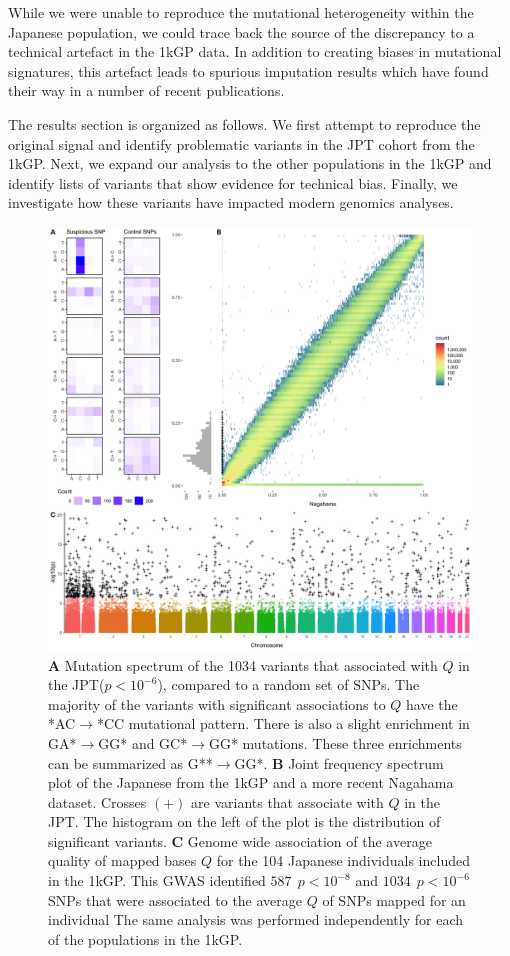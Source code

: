 \documentclass[9pt,lineno]{elife}
\begin{document}
While we were unable to reproduce the mutational heterogeneity within the Japanese population, we could trace back the source of the discrepancy to a technical artefact in the 1kGP data.
In addition to creating biases in mutational signatures, this artefact leads to spurious imputation results which have found their way in a number of recent publications.


The results section is organized as follows.
We first attempt to reproduce the original signal and identify problematic variants in the JPT cohort from the 1kGP. 
Next, we expand our analysis to the other populations in the 1kGP and identify lists of variants that show evidence for technical bias.
Finally, we investigate how these variants have impacted modern genomics analyses.  
  

\begin{figure}
\includegraphics[width=\hsize,keepaspectratio]{./Figures/Figure1.jpg}
\caption{
\textbf{A} 
Mutation spectrum of the 1034 variants that associated with $Q$ in the JPT($p < 10^{-6}$), compared to a random set of SNPs.
The majority of the variants with significant associations to $Q$ have the *AC${\rightarrow}$*CC mutational pattern. 
There is also a slight enrichment in GA*${\rightarrow}$GG* and GC*${\rightarrow}$GG* mutations. 
These three enrichments can be summarized as G**${\rightarrow}$GG*. \textbf{B} 
Joint frequency spectrum plot of the Japanese from the 1kGP and a more recent Nagahama dataset.
Crosses $(+)$ are variants that associate with $Q$ in the JPT. 
The histogram on the left of the plot is the distribution of significant variants. 
\textbf{C} 
Genome wide association of the average quality of mapped bases $Q$ for the 104 Japanese individuals included in the 1kGP. This GWAS identified $587\ \  p < 10^{-8}$ and $1034\ \ p < 10^{-6}$ SNPs that were associated to the average $Q$ of SNPs mapped for an individual
The same analysis was performed independently for each of the populations in the 1kGP.}
 \label{SFS}
\end{figure}
\end{document}
